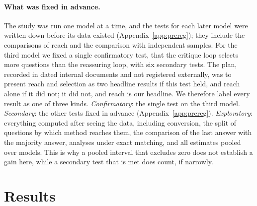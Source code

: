 \documentclass[11pt]{article}
\begin{document}
\paragraph{What was fixed in advance.}
The study was run one model at a time, and the tests for each later model were written down before its data existed (Appendix~\ref{app:prereg}); they include the comparisons of reach and the comparison with independent samples.
For the third model we fixed a single confirmatory test, that the critique loop selects more questions than the reassuring loop, with six secondary tests.
The plan, recorded in dated internal documents and not registered externally, was to present reach and selection as two headline results if this test held, and reach alone if it did not; it did not, and reach is our headline.
We therefore label every result as one of three kinds.
\emph{Confirmatory}: the single test on the third model.
\emph{Secondary}: the other tests fixed in advance (Appendix~\ref{app:prereg}).
\emph{Exploratory}: everything computed after seeing the data, including conversion, the split of questions by which method reaches them, the comparison of the last answer with the majority answer, analyses under exact matching, and all estimates pooled over models.
This is why a pooled interval that excludes zero does not establish a gain here, while a secondary test that is met does count, if narrowly.

\section{Results}
\end{document}
